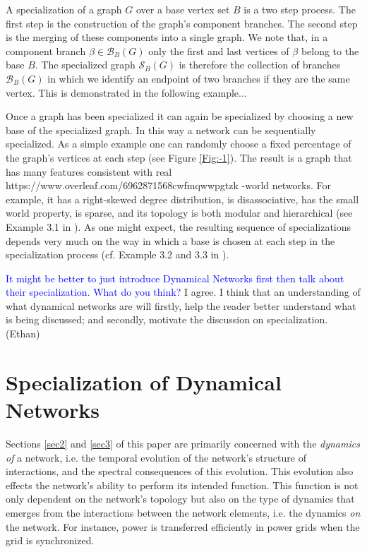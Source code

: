 \documentclass[10pt]{elsarticle}
\theoremstyle{remark}
\begin{document}
A specialization of a graph $G$ over a base vertex set $B$ is a two step process. The first step is the construction of the graph's component branches. The second step is the merging of these components into a single graph. We note that, in a component branch $\beta\in\mathcal{B}_B(G)$ only the first and last vertices of $\beta$ belong to the base $B$. The specialized graph $\mathcal{S}_B(G)$ is therefore the collection of branches $\mathcal{B}_B(G)$ in which we identify an endpoint of two branches if they are the same vertex. This is demonstrated in the following example...

Once a graph has been specialized it can again be specialized by choosing a new base of the specialized graph. In this way a network can be sequentially specialized. As a simple example one can randomly choose a fixed percentage of the graph's vertices at each step (see Figure \ref{Fig:-1}). The result is a graph that has many features consistent with real https://www.overleaf.com/6962871568cwfmqwwpgtzk -world networks. For example, it has a right-skewed degree distribution, is disassociative, has the small world property, is sparse, and its topology is both modular and hierarchical (see Example 3.1 in \cite{BSW18}). As one might expect, the resulting sequence of specializations depends very much on the way in which a base is chosen at each step in the specialization process (cf. Example 3.2 and 3.3 in \cite{BSW18}).

\begin{center}
    \textcolor{blue}{It might be better to just introduce Dynamical Networks first then talk about their specialization. What do you think?}
    I agree. I think that an understanding of what dynamical networks are will firstly, help the reader better understand what is being discussed; and secondly, motivate the discussion on specialization. (Ethan)
\end{center}

\section{Specialization of Dynamical Networks}
Sections \ref{sec2} and \ref{sec3} of this paper are primarily concerned with the \emph{dynamics of} a network, i.e. the temporal evolution of the network's structure of interactions, and the spectral consequences of this evolution. This evolution also effects the network's ability to perform its intended function. This function is not only dependent on the network's topology but also on the type of dynamics that emerges from the interactions between the network elements, i.e. the dynamics \emph{on} the network. For instance, power is transferred efficiently in power grids when the grid is synchronized.
\end{document}

